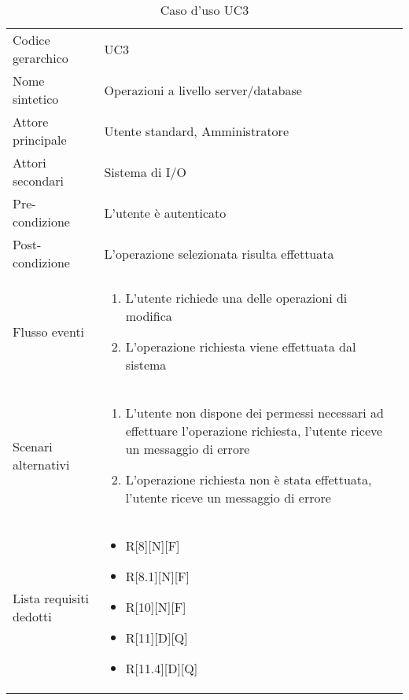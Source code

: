 \documentclass[a4paper]{report}
\begin{document}
		\begin{table}[H]
		\begin{tabularx}{\textwidth}{X | X}\toprule
			\rowcolor{orange!65}Codice gerarchico & UC3 \\
			Nome sintetico & Operazioni a livello server/database \\
			\rowcolor{orange!65}Attore principale & Utente standard, Amministratore\\
			Attori secondari & Sistema di I/O \\
			\rowcolor{orange!65}Pre-condizione & L'utente è autenticato\\
			Post-condizione & L'operazione selezionata risulta effettuata\\
			\rowcolor{orange!65}Flusso eventi & \begin{enumerate}
			\item L'utente richiede una delle operazioni di modifica
			\item L'operazione richiesta viene effettuata dal sistema
			\end{enumerate} \\
			Scenari alternativi & \begin{enumerate}
			\item L'utente non dispone dei permessi necessari ad effettuare l'operazione richiesta, l'utente
			riceve un messaggio di errore
			\item L'operazione richiesta non è stata effettuata, l'utente riceve un messaggio di errore
			\end{enumerate} \\
			\rowcolor{orange!65}Lista requisiti dedotti & \begin{itemize}
				\item R[8][N][F]
				\item R[8.1][N][F]
				\item R[10][N][F]
				\item R[11][D][Q]
				\item R[11.4][D][Q]
				\end{itemize} \\
			\bottomrule
		\end{tabularx}
		\caption{Caso d'uso UC3}
	 \end{table}
\end{document}
